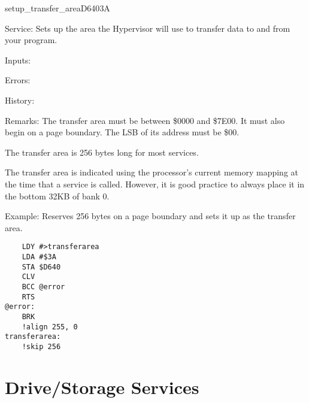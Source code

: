 %
\newpage
\begin{hyppotrap}{setup\_transfer\_area}{D640}{3A}
\item [Service:]
  Sets up the area the Hypervisor will use to transfer data to and from your
  program.
\item [Inputs:]
\item [Errors:]
\item [History:]
\item [Remarks:]
  The transfer area must be between \$0000 and \$7E00. It must also begin on a
  page boundary. The LSB of its address must be \$00.

  The transfer area is 256 bytes long for most services.

  The transfer area is indicated using the processor's current memory mapping at
  the time that a service is called. However, it is good practice to always
  place it in the bottom 32KB of bank 0.
\item [Example:]
  Reserves 256 bytes on a page boundary and sets it up as the transfer area.
\begin{tcolorbox}[colback=black,coltext=white]
\verbatimfont{\codefont}
\begin{verbatim}
    LDY #>transferarea
    LDA #$3A
    STA $D640
    CLV
    BCC @error
    RTS
@error:
    BRK
    !align 255, 0
transferarea:
    !skip 256
\end{verbatim}
\end{tcolorbox}
\end{hyppotrap}



\newpage
\section{Drive/Storage Services}

